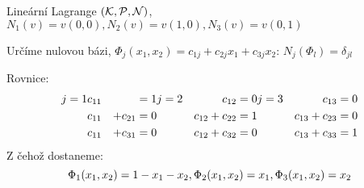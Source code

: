 \documentclass[../main.tex]{subfiles}
\begin{document}
\begin{example}
    \begin{figure}[ht]
        \centering
        \caption{}
        \label{fig:interpolantpriklad}
    \end{figure}


    Lineární Lagrange $(\mathcal{K}, \mathcal{P}, \mathcal{N})$, $N_1(v)= v(0,0), N_2(v) = v(1,0), N_3(v) = v(0,1)$

    Určíme nulovou bázi, $\Phi_j(x_1,x_2) = c_{1j} + c_{2j}x_1 + c_{3j}x_2$: $N_j(\Phi_l) = \delta_{jl}$

    Rovnice: 
    \begin{align}
    j=1 & c_{11}  &                  & =            1 \hfill j=2     & c_{12}           & =  0 \hfill j=3 & c_{13}             &= 0 \\
        & c_{11}  & + c_{21}         & =            0         & c_{12} + c_{22}  & =  1     & c_{13} + c_{23}    &= 0 \\
        & c_{11}  &        + c_{31}  &  = 0          & c_{12} + c_{32}  & = 0      & c_{13} + c_{33}    &= 1 
    \end{align}
    Z čehož dostaneme:
    \begin{equation}
        \Phi_1(x_1,x_2) = 1-x_1-x_2 \hfill ,\Phi_2(x_1,x_2) = x_1 \hfill ,\Phi_3(x_1,x_2) = x_2
    \end{equation}

\end{example}
\end{document}
